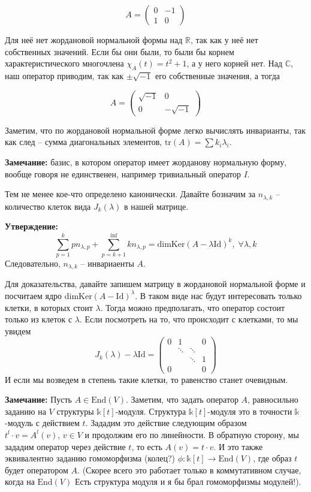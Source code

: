 \documentclass[a4paper, 12pt]{book}
\begin{document}
\[A=\left(\begin{array}{cc}0 & -1\\ 1 & 0\end{array}\right)\]

Для неё нет жордановой нормальной формы над $\mathbb{R}$, так как у неё нет
собственных значений. Если бы они были, то были бы корнем характеристического
многочлена $\chi_A(t)=t^2+1$, а у него корней нет. Над $\mathbb{C}$, наш
оператор приводим, так как $\pm\sqrt{-1}$ его собственные значения, а тогда

\[A=\left(\begin{array}{cc}\sqrt{-1} & 0\\ 0 & -\sqrt{-1}\end{array}\right)\]

Заметим, что по жордановой нормальной форме легко вычислять инварианты, так как
след – сумма диагональных элементов, $\text{tr}(A)=\sum k_i\lambda_i$.

\textbf{Замечание:} базис, в котором оператор имеет жорданову нормальную форму,
вообще говоря не единственен, например тривиальный оператор $I$.

Тем не менее кое-что определено канонически. Давайте бозначим за $n_{\lambda,k}$
– количество клеток вида $J_k(\lambda)$ в нашей матрице.

\textbf{Утверждение:}
\[\sum_{p=1}^k pn_{\lambda, p}+\sum_{p=k+1}^{\inf}kn_{\lambda, p} =
\text{dimKer}(A-\lambda\text{Id})^k,\;\forall\lambda,k\]
Следовательно, $n_{\lambda, k}$ – инвариаенты $A$.

Для доказательства, давайте запишем матрицу в жордановой нормальной форме и 
посчитаем ядро $\text{dimKer}(A-\text{Id})^\lambda$. В таком виде нас будут
интересовать только клетки, в которых стоит $\lambda$. Тогда можно предполагать,
что оператор состоит только из клеток с $\lambda$. Если посмотреть на то, что
происходит с клетками, то мы увидем
\[J_k(\lambda)-\lambda\text{Id}=\left(\begin{array}{cccc}
    0 & 1      &        & 0\\
      & \ddots & \ddots & \\
      &        & \ddots & 1\\
    0 &        &        & 0
\end{array}\right)\]
И если мы возведем в степень такие клетки, то равенство станет очевидным.

\textbf{Замечание:} Пусть $A\in\text{End}(V)$. Заметим, что задать оператор $A$,
равносильно заданию на $V$ структуры $\mathbb{k}[t]$-модуля. Структура
$\mathbb{k}[t]$-модуля это в точности $\mathbb{k}$-модуль с действием $t$.
Зададим это действие следующим образом $t^l\cdot v=A^l(v),\,v\in V$ и продолжим
его по линейности. В обратную сторону, мы зададим оператор через действие $t$,
то есть $A(v)=t\cdot v$. И это также эквивалентно заданию гомоморфизма (колец?)
$\phi: \mathbb{k}[t]\rightarrow\text{End}(V)$, где образ $t$ будет оператором
$A$. (Скорее всего это работает только в коммутативном случае, когда на $\text{End}(V)$
Есть структура модуля и я бы брал гомоморфизмы модулей!).
\end{document}
